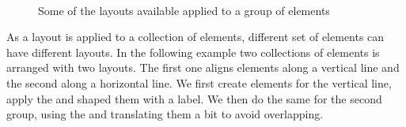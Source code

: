 \documentclass[a4paper,10pt,twoside]{book}
\begin{document}
\begin{figure}[h]
        \centering
		 \hfill
		\hfill
		 \\ 
		 \hfill
		\hfill
        \caption{Some of the layouts available applied to a group of elements}\label{fig:roLayouts}
\end{figure}

As a layout is applied to a collection of elements, different set of elements can have different layouts. In the following example two collections of elements is arranged with two layouts. The first one aligns elements along a vertical line and the second along a horizontal line. 
We first create elements for the vertical line, apply the  and shaped them with a label. We then do the same for the second group, using the  and translating them a bit to avoid overlapping.
\end{document}
